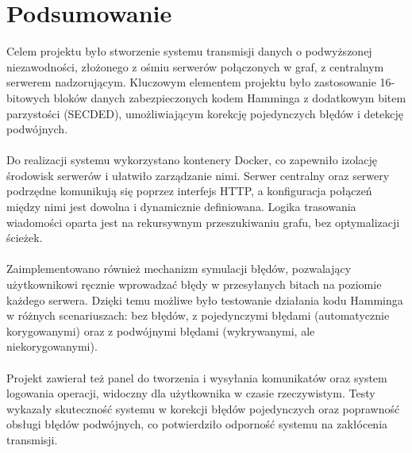 \section{Podsumowanie}

Celem projektu było stworzenie systemu transmisji danych o podwyższonej niezawodności, złożonego z ośmiu serwerów połączonych w graf, z centralnym serwerem nadzorującym. Kluczowym elementem projektu było zastosowanie 16-bitowych bloków danych zabezpieczonych kodem Hamminga z dodatkowym bitem parzystości (SECDED), umożliwiającym korekcję pojedynczych błędów i detekcję podwójnych.

\paragraph{}Do realizacji systemu wykorzystano kontenery Docker, co zapewniło izolację środowisk serwerów i ułatwiło zarządzanie nimi. Serwer centralny oraz serwery podrzędne komunikują się poprzez interfejs HTTP, a konfiguracja połączeń między nimi jest dowolna i dynamicznie definiowana. Logika trasowania wiadomości oparta jest na rekursywnym przeszukiwaniu grafu, bez optymalizacji ścieżek.

\paragraph{}Zaimplementowano również mechanizm symulacji błędów, pozwalający użytkownikowi ręcznie wprowadzać błędy w przesyłanych bitach na poziomie każdego serwera. Dzięki temu możliwe było testowanie działania kodu Hamminga w różnych scenariuszach: bez błędów, z pojedynczymi błędami (automatycznie korygowanymi) oraz z podwójnymi błędami (wykrywanymi, ale niekorygowanymi).

\paragraph{}Projekt zawierał też panel do tworzenia i wysyłania komunikatów oraz system logowania operacji, widoczny dla użytkownika w czasie rzeczywistym. Testy wykazały skuteczność systemu w korekcji błędów pojedynczych oraz poprawność obsługi błędów podwójnych, co potwierdziło odporność systemu na zakłócenia transmisji.
